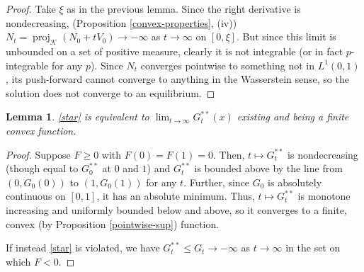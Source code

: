 \documentclass[11pt]{article}
\newtheorem{lemma}[thm]{Lemma}
\numberwithin{equation}{section}
\DeclareMathOperator{\proj}{proj}
\begin{document}
\begin{proof}
    Take $\xi$ as in the previous lemma. Since the right derivative is nondecreasing, (Proposition \ref{convex-properties}, \textup{(iv)}) $N_t=\proj_{\mathcal{K}}(N_0+tV_0)\to-\infty$ as $t\to\infty$ on $[0,\xi]$. %
    But since this limit is unbounded on a set of positive measure, clearly it is not integrable (or in fact $p$-integrable for any $p$). Since $N_t$ converges pointwise to something not in $L^1(0,1)$, its push-forward cannot converge to anything in the Wasserstein sense, so the solution does not converge to an equilibrium.
\end{proof}

\begin{lemma}\label{exist-finite-lemma}
    \eqref{star} is equivalent to $\displaystyle \lim_{t\to\infty} G_t^{**}(x)$ existing and being a finite convex function. 
\end{lemma}
\begin{proof}
    Suppose $F\geq0$ with $F(0)=F(1)=0$. Then, $t\mapsto G_t^{**}$ is nondecreasing (though equal to $G_0^{**}$ at $0$ and $1$) and $G_t^{**}$ is bounded above by the line from $(0,G_0(0))$ to $(1,G_0(1))$ for any $t$. Further, since $G_0$ is absolutely continuous on $[0,1]$, it has an absolute minimum. Thus, $t\mapsto G_t^{**}$ is monotone increasing and uniformly bounded below and above, so it converges to a finite, convex (by Proposition \ref{pointwise-sup}) function.  

    If instead \eqref{star} is violated, we have $G_t^{**}\leq G_t\to-\infty$ as $t\to\infty$ in the set on which $F<0$. 
\end{proof}
\end{document}
